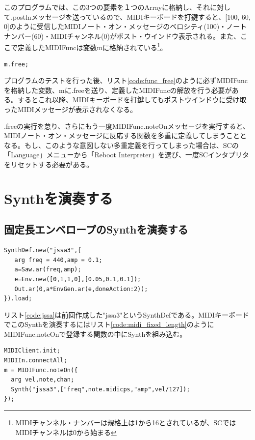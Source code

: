 \documentclass{jsarticle}
\begin{document}
このプログラムでは、この3つの要素を１つのArrayに格納し、それに対して.postlnメッセージを送っているので、MIDIキーボードを打鍵すると、[100, 60, 0]のように受信したMIDIノート・オン・メッセージのベロシティ(100)・ノートナンバー(60)・MIDIチャンネル(0)がポスト・ウインドウ表示される。また、ここで定義したMIDIFuncは変数mに格納されている\footnote{MIDIチャンネル・ナンバーは規格上は1から16とされている\cite{midiorg}が、SCではMIDIチャンネルは0から始まる}。

\begin{lstlisting}[caption=関数の解放, label=code:func_free]
m.free;
\end{lstlisting}

プログラムのテストを行った後、リスト\ref{code:func_free}のように必ずMIDIFuncを格納した変数、mに.freeを送り、定義したMIDIFuncの解放を行う必要がある。するとこれ以降、MIDIキーボードを打鍵してもポストウインドウに受け取ったMIDIメッセージが表示されなくなる。

.freeの実行を怠り、さらにもう一度MIDIFunc.noteOnメッセージを実行すると、MIDIノート・オン・メッセージに反応する関数を多重に定義してしまうこととなる。もし、このような意図しない多重定義を行ってしまった場合は、SCの「Language」メニューから「Reboot Interpreter」を選び、一度SCインタプリタをリセットする必要がある。

\section{Synthを演奏する}
\subsection{固定長エンベロープのSynthを演奏する}
\begin{lstlisting}[caption=固定長エンベロープのSynthの例,label=code:jssa]
SynthDef.new("jssa3",{
   arg freq = 440,amp = 0.1;
   a=Saw.ar(freq,amp);
   e=Env.new([0,1,1,0],[0.05,0.1,0.1]);
   Out.ar(0,a*EnvGen.ar(e,doneAction:2));
}).load;
\end{lstlisting}
リスト\ref{code:jssa}は前回作成した"jssa3"というSynthDefである。MIDIキーボードでこのSynthを演奏するにはリスト\ref{code:midi_fixed_length}のようにMIDIFunc.noteOnで登録する関数の中にSynthを組み込む。

\begin{lstlisting}[caption=SynthとMIDIメッセージを関連付ける,label=code:midi_fixed_length]
MIDIClient.init;
MIDIIn.connectAll;
m = MIDIFunc.noteOn({
  arg vel,note,chan;
  Synth("jssa3",["freq",note.midicps,"amp",vel/127]);
});
\end{lstlisting}
\end{document}
